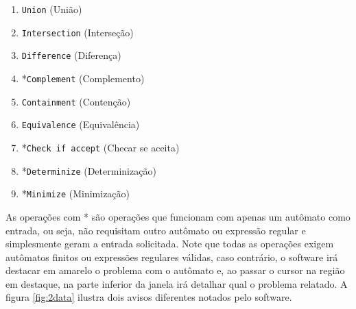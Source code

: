 \documentclass{article}
\begin{document}
        \begin{enumerate}
            \item \texttt{Union} (União)
            \item \texttt{Intersection} (Interseção)
            \item \texttt{Difference} (Diferença)
            \item *\texttt{Complement} (Complemento)
            \item \texttt{Containment} (Contenção)
            \item \texttt{Equivalence} (Equivalência)
            \item *\texttt{Check if accept} (Checar se aceita)
            \item *\texttt{Determinize} (Determinização)
            \item *\texttt{Minimize} (Minimização) 
        \end{enumerate}

        As operações com * são operações que funcionam com apenas um autômato
        como entrada, ou seja, não requisitam outro autômato ou expressão
        regular e simplesmente geram a entrada solicitada. Note que todas as
        operações exigem autômatos finitos ou expressões regulares válidas,
        caso contrário, o software irá destacar em amarelo o problema com o
        autômato e, ao passar o cursor na região em destaque, na parte inferior
        da janela irá detalhar qual o problema relatado. A figura
        \ref{fig:2data} ilustra dois avisos diferentes notados pelo software.
\end{document}
